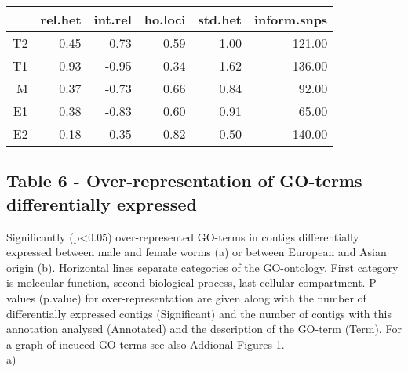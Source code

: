 \documentclass[10pt]{bmc_article}
\newenvironment{bmcformat}{\begin{raggedright}\baselineskip20pt\sloppy\setboolean{publ}{false}}{\end{raggedright}\baselineskip20pt\sloppy}
\begin{document}
\begin{bmcformat}
\begin{table}[ht]
\begin{center}
\begin{tabular}{rrrrrr}
  \hline
 & rel.het & int.rel & ho.loci & std.het & inform.snps \\ 
  \hline
T2 & 0.45 & -0.73 & 0.59 & 1.00 & 121.00 \\ 
  T1 & 0.93 & -0.95 & 0.34 & 1.62 & 136.00 \\ 
  M & 0.37 & -0.73 & 0.66 & 0.84 & 92.00 \\ 
  E1 & 0.38 & -0.83 & 0.60 & 0.91 & 65.00 \\ 
  E2 & 0.18 & -0.35 & 0.82 & 0.50 & 140.00 \\ 
   \hline
\end{tabular}
\end{center}
\end{table}
\subsection*{Table 6 - Over-representation of GO-terms differentially
  expressed}

Significantly (p<0.05) over-represented GO-terms in contigs
differentially expressed between male and female worms (a) or between
European and Asian origin (b). Horizontal lines separate categories of
the GO-ontology. First category is molecular function, second
biological process, last cellular compartment. P-values (p.value) for
over-representation are given along with the number of differentially
expressed contigs (Significant) and the number of contigs with this
annotation analysed (Annotated) and the description of the GO-term
(Term). For a graph of
incuced GO-terms see also Addional Figures 1.\\

a)\\


\end{bmcformat}
\end{document}

